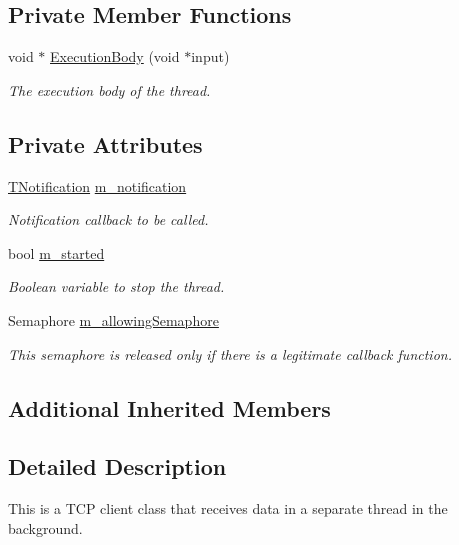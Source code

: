 \subsection*{Private Member Functions}
\begin{DoxyCompactItemize}
\item 
void $\ast$ \hyperlink{class_threaded_t_c_p_client_a1cd1c985635fe8f87c444d3b78fcaefb}{Execution\-Body} (void $\ast$input)
\begin{DoxyCompactList}\small\item\em The execution body of the thread. \end{DoxyCompactList}\end{DoxyCompactItemize}
\subsection*{Private Attributes}
\begin{DoxyCompactItemize}
\item 
\hyperlink{class_threaded_t_c_p_client_a67efb980455f9da4cdecd46eebbbb568}{T\-Notification} \hyperlink{class_threaded_t_c_p_client_adc7409a7ec74e4ee527be24008cc2208}{m\-\_\-notification}
\begin{DoxyCompactList}\small\item\em Notification callback to be called. \end{DoxyCompactList}\item 
bool \hyperlink{class_threaded_t_c_p_client_a32d0d8b7239c8eda6ff9d4ab45de5e8e}{m\-\_\-started}
\begin{DoxyCompactList}\small\item\em Boolean variable to stop the thread. \end{DoxyCompactList}\item 
Semaphore \hyperlink{class_threaded_t_c_p_client_a54007f130f17856b944f0f35656ebc5c}{m\-\_\-allowing\-Semaphore}
\begin{DoxyCompactList}\small\item\em This semaphore is released only if there is a legitimate callback function. \end{DoxyCompactList}\end{DoxyCompactItemize}
\subsection*{Additional Inherited Members}


\subsection{Detailed Description}
This is a T\-C\-P client class that receives data in a separate thread in the background. 

